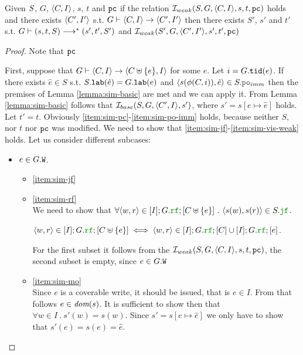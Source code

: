 \documentclass[12pt]{article}
\begin{document}
\begin{lemma}
  Given $S$, $G$, $\langle C, I \rangle$, $s$, $t$ and ${\mathtt{pc}}$
  if the relation $\mathcal{I}_{weak}(S, G, \langle C, I \rangle, s, t, {\mathtt{pc}})$ holds and 
  there exists $\langle C', I' \rangle$
  s.t. $G \vdash \langle C, I \rangle \rightarrow \langle C', I' \rangle$
  then there exists $S'$, $s'$ and $t'$ s.t. $G \vdash (s, t, S) \longrightarrow^* (s', t', S')$
  and $\mathcal{I}_{weak}(S', G, \langle C', I' \rangle, s', t', {\mathtt{pc}})$ 
\end{lemma}

\begin{proof}
  Note that ${\mathtt{pc}}$ 
  
  First, suppose that 
  $G \vdash \langle C, I \rangle \rightarrow \langle C \uplus \{e\}, I \rangle$ for some $e$.
  Let $i = G.{\mathtt{tid}}(e)$.
  If there exists $\hat{e} \in S$ s.t. $S.{\mathtt{lab}}(\hat{e}) = G.{\mathtt{lab}}(e)$ and 
  $\tup{s(\front(C, i)), \hat{e}} \in S.\lPO_{imm}$
  then the premises of Lemma \ref{lemma:sim-basic} are met and we can apply it.
  From Lemma \ref{lemma:sim-basic} follows that $\mathcal{I}_{base}(S, G, \langle C', I \rangle, s')$,
  where $s' = s[e \mapsto \hat{e}]$ holds.
  Let $t' = t$.
  Obviously \ref{item:sim-pc}-\ref{item:sim-po-imm} holds,
  because neither $S$, nor $t$ nor ${\mathtt{pc}}$ was modified. 
  We need to show that \ref{item:sim-jf}-\ref{item:sim-vis-weak} holds.
  Let us consider different subcases:
  \begin{itemize}
  \item $e \in G.{\mathtt{W}}$.
    \begin{itemize}

    \item \ref{item:sim-jf} \\

    \item \ref{item:sim-rf} \\
      We need to show that
      $\forall{\tup{w, r} \in [I];G.\lRF;[\lC \uplus\{e\}]} ~.~
      \tup{s(w), s(r)} \in \lES.\lJF
      $.
      
      $\tup{w, r} \in [I];G.\lRF;[\lC \uplus\{e\}] \iff
      \tup{w, r} \in [I];G.\lRF;[\lC] \cup  [I];G.\lRF;[e]
      $.
      
      For the first subset it follows from the $\mathcal{I}_{weak}(S, G, \langle C, I \rangle, s, t, {\mathtt{pc}})$,
      the second subset is empty, since $e \in G.{\mathtt{W}}$

    \item \ref{item:sim-mo} \\
      Since $e$ is a coverable write, it should be issued, that is $e \in I$.
      From that follows $e \in \textit{dom}{({s})}$.
      It is sufficient to show then that $\forall{w \in I} ~.~ s'(w) = s(w)$.
      Since $s' = s[e \mapsto \hat{e}]$ we only have to show that $s'(e) = s(e) = \hat{e}$.
      

\end{itemize}
\end{itemize}
\end{proof}
\end{document}
